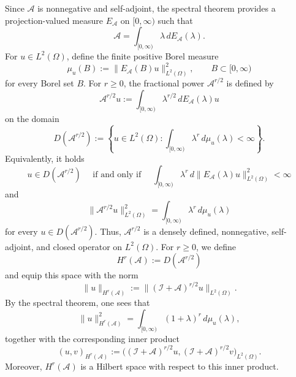 \documentclass[10pt,a4paper]{amsart}
\numberwithin{equation}{section}
\begin{document}
Since \(\mathcal{A}\) is nonnegative and self-adjoint, the spectral theorem provides a projection-valued measure \(E_\mathcal{A}\) on \([0,\infty)\) such that
\begin{equation*}
\mathcal{A}
=
\int_{[0,\infty)}
\lambda\,dE_\mathcal{A}(\lambda).
\end{equation*}
For \(u\in L^2(\Omega)\), define the finite positive Borel measure
\[
\mu_u(B)
:=
\big\|E_\mathcal{A}(B)u\big\|_{L^2(\Omega)}^2,
\qquad
B\subset[0,\infty)
\]
for every Borel set \(B\). For \(r\ge0\), the fractional power
\(\mathcal{A}^{r/2}\) is defined by
\begin{equation*}
\mathcal{A}^{r/2}u
:=
\int_{[0,\infty)}
\lambda^{r/2}\,dE_\mathcal{A}(\lambda)u
\end{equation*}
on the domain
\begin{equation*}
D(\mathcal{A}^{r/2})
:=
\left\{
u\in L^2(\Omega):
\int_{[0,\infty)}
\lambda^r\,d\mu_u(\lambda)<\infty
\right\}.
\end{equation*}
Equivalently, it holds
\[
u\in D(\mathcal{A}^{r/2})
\quad\text{ if and only if }\quad
\int_{[0,\infty)}
\lambda^r
\,d\|E_\mathcal{A}(\lambda)u\|_{L^2(\Omega)}^2
<\infty
\]
and
\begin{equation*}
\big\|\mathcal{A}^{r/2}u\big\|_{L^2(\Omega)}^2
=
\int_{[0,\infty)}
\lambda^r\,d\mu_u(\lambda)
\end{equation*}
for every \(u\in D(\mathcal{A}^{r/2})\). Thus, \(\mathcal{A}^{r/2}\) is a densely defined, nonnegative, self-adjoint, and closed operator on \(L^2(\Omega)\). For \(r\ge0\), we define
\begin{equation*}
H^r(\mathcal{A})
:=
D(\mathcal{A}^{r/2})
\end{equation*}
and equip this space with the norm
\begin{equation*}
\|u\|_{H^r(\mathcal{A})}
:=
\|(\mathcal{I}+\mathcal{A})^{r/2}u\|_{L^2(\Omega)}.
\end{equation*}
By the spectral theorem, one sees that
\begin{equation*}
\|u\|_{H^r(\mathcal{A})}^2
=
\int_{[0,\infty)}
(1+\lambda)^r\,d\mu_u(\lambda),
\end{equation*}
together with the corresponding inner product
\begin{equation*}
(u,v)_{H^r(\mathcal{A})}
:=
\Big(
(\mathcal{I}+\mathcal{A})^{r/2}u,
(\mathcal{I}+\mathcal{A})^{r/2}v
\Big)_{L^2(\Omega)}.
\end{equation*}
Moreover, \(H^r(\mathcal{A})\) is a Hilbert space with respect to this inner product. 
\end{document}
